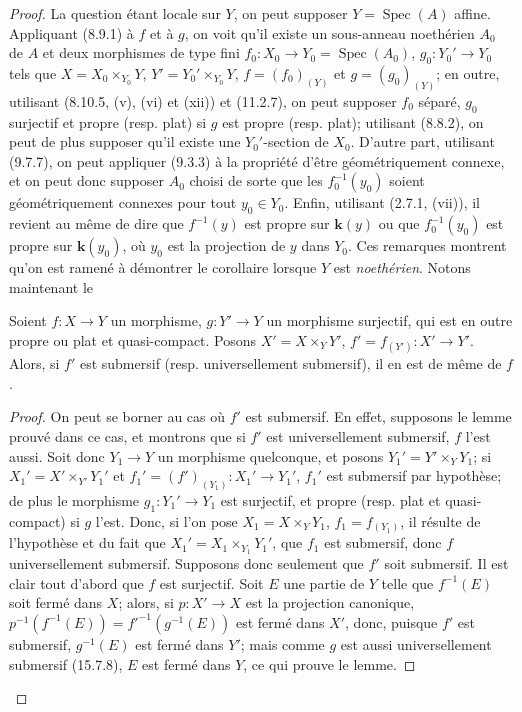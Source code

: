 \begin{proof}
La question étant locale sur $Y$, on peut supposer $Y=\operatorname{Spec}(A)$ affine. Appliquant (8.9.1) à $f$ et à $g$, on voit qu'il existe un sous-anneau noethérien $A_0$ de $A$ et deux morphismes de type fini $f_0:X_0\to Y_0=\operatorname{Spec}(A_0)$, $g_0:Y_0'\to Y_0$ tels que $X=X_0\times_{Y_0}Y$, $Y'=Y_0'\times_{Y_0}Y$, $f=(f_0)_{(Y)}$ et $g=(g_0)_{(Y)}$; en outre, utilisant (8.10.5, (v), (vi) et (xii)) et (11.2.7), on peut supposer $f_0$ séparé, $g_0$ surjectif et propre (resp. plat) si $g$ est propre (resp. plat); utilisant (8.8.2), on peut de plus supposer qu'il existe une $Y_0'$-section de $X_0$. D'autre part, utilisant (9.7.7), on peut appliquer (9.3.3) à la propriété d'être géométriquement connexe, et on peut donc supposer $A_0$ choisi de sorte que les $f_0^{-1}(y_0)$ soient géométriquement connexes pour tout $y_0\in Y_0$. Enfin, utilisant (2.7.1, (vii)), il revient au même de dire que $f^{-1}(y)$ est propre sur $\boldsymbol{k}(y)$ ou que $f_0^{-1}(y_0)$ est propre sur $\boldsymbol{k}(y_0)$, où $y_0$ est la projection de $y$ dans $Y_0$. Ces remarques montrent qu'on est ramené à démontrer le corollaire lorsque $Y$ est \emph{noethérien}. Notons maintenant le

\begin{lemma}[15.7.11.1]
\label{IV.15.7.11.1-fr}
Soient $f:X\to Y$ un morphisme, $g:Y'\to Y$ un morphisme surjectif, qui est en outre propre \textup{ou} plat et quasi-compact. Posons $X'=X\times_Y Y'$, $f'=f_{(Y')}:X'\to Y'$. Alors, si $f'$ est submersif \textup{(resp.} universellement submersif\textup{)}, il en est de même de $f$.
\end{lemma}

\begin{proof}
On peut se borner au cas où $f'$ est submersif. En effet, supposons le lemme prouvé dans ce cas, et montrons que si $f'$ est universellement submersif, $f$ l'est aussi. Soit donc $Y_1\to Y$ un morphisme quelconque, et posons $Y_1'=Y'\times_Y Y_1$; si $X_1'=X'\times_{Y'}Y_1'$ et $f_1'=(f')_{(Y_1)}:X_1'\to Y_1'$, $f_1'$ est submersif par hypothèse; de plus le morphisme $g_1:Y_1'\to Y_1$ est surjectif, et propre (resp. plat et quasi-compact) si $g$ l'est. Donc, si l'on pose $X_1=X\times_Y Y_1$, $f_1=f_{(Y_1)}$, il résulte de l'hypothèse et du fait que $X_1'=X_1\times_{Y_1}Y_1'$, que $f_1$ est submersif, donc $f$ universellement submersif. Supposons donc seulement que $f'$ soit submersif. Il est clair tout d'abord que $f$ est surjectif. Soit $E$ une partie de $Y$ telle que $f^{-1}(E)$ soit fermé dans $X$; alors, si $p:X'\to X$ est la projection canonique,
$p^{-1}(f^{-1}(E))=f'^{-1}(g^{-1}(E))$ est fermé dans $X'$, donc, puisque $f'$ est submersif, $g^{-1}(E)$ est fermé dans $Y'$; mais comme $g$ est aussi universellement submersif (15.7.8), $E$ est fermé dans $Y$, ce qui prouve le lemme.
\end{proof}


\end{proof}
